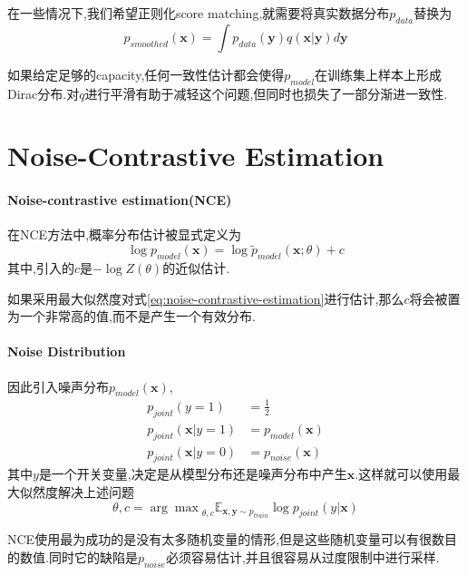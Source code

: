 在一些情况下,我们希望正则化score matching,就需要将真实数据分布$p_{data}$替换为
\begin{equation}
p_{smoothed}(\mathbf x)=\int p_{data}(\mathbf y)q(\mathbf x|\mathbf y)d\mathbf y
\end{equation}

如果给定足够的capacity,任何一致性估计都会使得$p_{model}$在训练集上样本上形成Dirac分布.对$q$进行平滑有助于减轻这个问题,但同时也损失了一部分渐进一致性.

\section{Noise-Contrastive Estimation}

\paragraph{Noise-contrastive estimation(NCE)}在NCE方法中,概率分布估计被显式定义为
\begin{equation}\label{eq:noise-contrastive-estimation}
\log p_{model}(\mathbf x)=\log\tilde p_{model}(\mathbf x;\theta)+c
\end{equation}
其中,引入的$c$是$-\log Z(\theta)$的近似估计.

如果采用最大似然度对式\ref{eq:noise-contrastive-estimation}进行估计,那么$c$将会被置为一个非常高的值,而不是产生一个有效分布.

\paragraph{Noise Distribution}因此引入噪声分布$p_{model}(\mathbf x)$,
\begin{equation}\begin{split}
p_{joint}(y=1)&=\frac{1}{2}\\
p_{joint}(\mathbf x|y=1)&=p_{model}(\mathbf x)\\
p_{joint}(\mathbf x|y=0)&=p_{noise}(\mathbf x)
\end{split}\end{equation}
其中$y$是一个开关变量,决定是从模型分布还是噪声分布中产生$\mathbf x$.这样就可以使用最大似然度解决上述问题
\begin{equation}
\theta,c={\arg\max}_{\theta,c}\mathbb E_{\mathbf{x,y}\sim p_{train}}\log p_{joint}(y|\mathbf x)
\end{equation}

NCE使用最为成功的是没有太多随机变量的情形,但是这些随机变量可以有很数目的数值.同时它的缺陷是$p_{noise}$必须容易估计,并且很容易从过度限制中进行采样.

